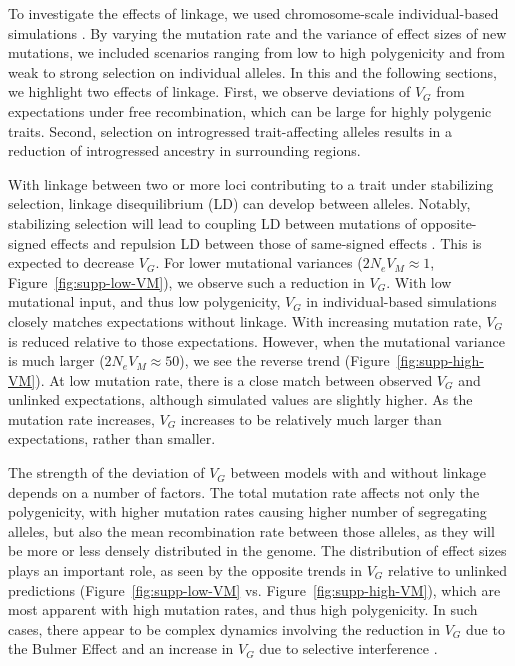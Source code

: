 \documentclass{article}
\begin{document}
To investigate the effects of linkage, we used chromosome-scale
individual-based simulations \citep{thornton2019polygenic}. By varying the
mutation rate and the variance of effect sizes of new mutations, we included
scenarios ranging from low to high polygenicity and from weak to strong
selection on individual alleles. In this and the following sections, we
highlight two effects of linkage. First, we observe deviations of $V_G$ from
expectations under free recombination, which can be large for highly polygenic
traits. Second, selection on introgressed trait-affecting alleles results in a
reduction of introgressed ancestry in surrounding regions.

With linkage between two or more loci contributing to a trait under stabilizing
selection, linkage disequilibrium (LD) can develop between alleles. Notably,
stabilizing selection will lead to coupling LD between mutations of
opposite-signed effects and repulsion LD between those of same-signed effects
\citep{bulmer1971effect}. This is expected to decrease $V_G$. For lower
mutational variances ($2N_e V_M\approx1$, Figure~\ref{fig:supp-low-VM}), we
observe such a reduction in $V_G$. With low mutational input, and thus low
polygenicity, $V_G$ in individual-based simulations closely matches
expectations without linkage. With increasing mutation rate, $V_G$ is reduced
relative to those expectations. However, when the mutational variance is much
larger ($2N_eV_M\approx 50$), we see the reverse trend
(Figure~\ref{fig:supp-high-VM}). At low mutation rate, there is a close match
between observed $V_G$ and unlinked expectations, although simulated values are
slightly higher. As the mutation rate increases, $V_G$ increases to be
relatively much larger than expectations, rather than smaller.

The strength of the deviation of $V_G$ between models with and without linkage
depends on a number of factors. The total mutation rate affects not only the
polygenicity, with higher mutation rates causing higher number of segregating
alleles, but also the mean recombination rate between those alleles, as they
will be more or less densely distributed in the genome. The distribution of
effect sizes plays an important role, as seen by the opposite trends in $V_G$
relative to unlinked predictions (Figure~\ref{fig:supp-low-VM} vs.
Figure~\ref{fig:supp-high-VM}), which are most apparent with high mutation
rates, and thus high polygenicity. In such cases, there appear to be complex
dynamics involving the reduction in $V_G$ due to the Bulmer Effect
\citep{bulmer1971effect} and an increase in $V_G$ due to selective interference
\citep{hill1966effect}.
\end{document}
